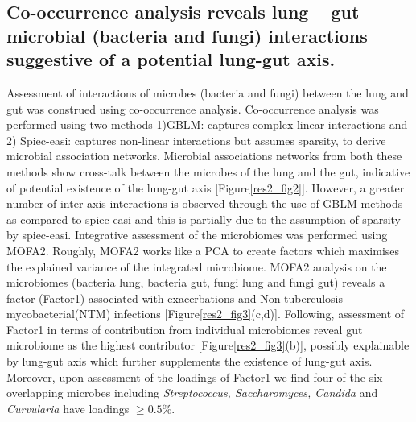 \subsection{Co-occurrence analysis reveals lung – gut microbial (bacteria and fungi) interactions suggestive of a potential lung-gut axis.}
Assessment of interactions of microbes (bacteria and fungi) between the lung and gut was construed using co-occurrence analysis. Co-occurrence analysis was performed using two methods 1)GBLM: captures complex linear interactions and 2) Spiec-easi: captures non-linear interactions but assumes sparsity, to derive microbial association networks. Microbial associations networks from both these methods show cross-talk between the microbes of the lung and the gut, indicative of potential existence of the lung-gut axis [Figure\ref{res2_fig2}]. However, a greater number of inter-axis interactions is observed through the use of GBLM methods as compared to spiec-easi and this is partially due to the assumption of sparsity by spiec-easi. Integrative assessment of the microbiomes was performed using MOFA2. Roughly, MOFA2 works like a PCA to create factors which maximises the explained variance of the integrated microbiome. MOFA2 analysis on the microbiomes (bacteria lung, bacteria gut, fungi lung and fungi gut) reveals a factor (Factor1) associated with exacerbations and Non-tuberculosis mycobacterial(NTM) infections [Figure\ref{res2_fig3}(c,d)]. Following, assessment of Factor1 in terms of contribution from individual microbiomes reveal gut microbiome as the highest contributor [Figure\ref{res2_fig3}(b)], possibly explainable by lung-gut axis which further supplements the existence of lung-gut axis. Moreover, upon assessment of the loadings of Factor1 we find four of the six overlapping microbes including \emph{Streptococcus, Saccharomyces, Candida} and \emph{Curvularia} have loadings $\geq 0.5\%$.


